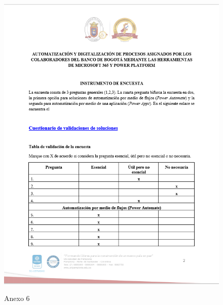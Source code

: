 \begin{figure}[H]
	\centering
	\includegraphics[scale=0.4]{Capitulo6/6}
	\label{anexo6}
	\caption{Anexo 6}
\end{figure}

